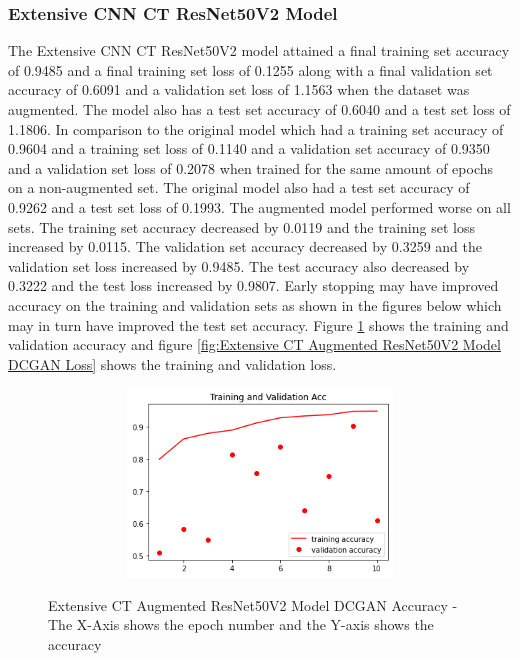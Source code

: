 \subsubsection{Extensive CNN CT ResNet50V2 Model}
The Extensive CNN CT ResNet50V2 model attained a final training set accuracy of 0.9485 and a final training set loss of 0.1255 along with a final validation set accuracy of 0.6091 and a validation set loss of 1.1563 when the dataset was augmented.  The model also has a test set accuracy of 0.6040 and a test set loss of 1.1806.  In comparison to the original model which had a training set accuracy of 0.9604 and a training set loss of 0.1140 and a validation set accuracy of 0.9350 and a validation set loss of 0.2078  when trained for the same amount of epochs on a non-augmented set.  The original model also had a test set accuracy of 0.9262 and a test set loss of 0.1993.  The augmented model performed worse on all sets.  The training set accuracy decreased by 0.0119 and the training set loss increased by 0.0115. The validation set accuracy decreased by 0.3259 and the validation set loss increased by 0.9485. The test accuracy also decreased by 0.3222 and the test loss increased by 0.9807.  Early stopping may have improved accuracy on the training and validation sets as shown in the figures below which may in turn have improved the test set accuracy.  Figure \ref{fig:Extensive CT Augmented ResNet50V2 Model DCGAN Accuracy} shows the training and validation accuracy and figure \ref{fig:Extensive CT Augmented ResNet50V2 Model DCGAN Loss} shows the training and validation loss.
 \begin{figure}[H]
    \centering    \includegraphics[width=1\textwidth,height=5cm,keepaspectratio]{Images/ResNet50V2BaselineTrainingValidationAccuracyExtensiveCTAugmentedDCGAN.png}\\
    \caption{Extensive CT Augmented ResNet50V2 Model DCGAN Accuracy - The X-Axis shows the epoch number and the Y-axis shows the accuracy}
    \label{fig:Extensive CT Augmented ResNet50V2 Model DCGAN Accuracy}
\end{figure}
